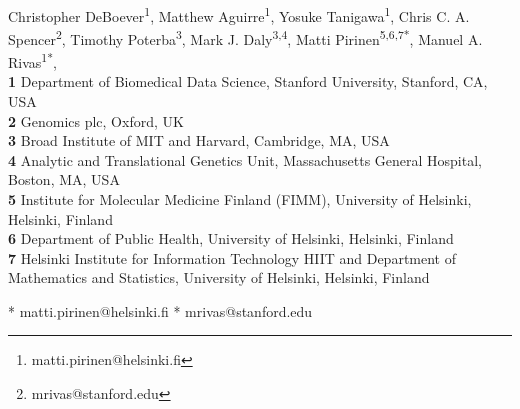 
\usepackage{float}

\newcommand{\lorem}{{\bf LOREM}}
\newcommand{\ipsum}{{\bf IPSUM}}

\def\bs{\boldsymbol}
\def\Vy{\widehat{\textrm{V}}_Y}



\vspace*{0.2in}

\begin{flushleft}
{\Large
\textbf{} %
}
\newline
\\
\author{Christopher DeBoever$^{1}$, Matthew Aguirre$^{1}$, Yosuke Tanigawa$^{1}$, Chris C. A. Spencer$^{2}$, Timothy Poterba$^{3}$, Mark J. Daly$^{4,5}$,  Matti Pirinen$^{5}$\thanks{matti.pirinen@helsinki.fi}, and Manuel A. Rivas$^{1}$\thanks{mrivas@stanford.edu}}
Christopher DeBoever\textsuperscript{1},
Matthew Aguirre\textsuperscript{1},
Yosuke Tanigawa\textsuperscript{1},
Chris C. A. Spencer\textsuperscript{2},
Timothy Poterba\textsuperscript{3},
Mark J. Daly\textsuperscript{3,4},
Matti Pirinen\textsuperscript{5,6,7*},
Manuel A. Rivas\textsuperscript{1*},
\\
\bigskip
\textbf{1} Department of Biomedical Data Science, Stanford University, Stanford, CA, USA
\\
\textbf{2} Genomics plc, Oxford, UK
\\
\textbf{3} Broad Institute of MIT and Harvard, Cambridge, MA, USA
\\
\textbf{4} Analytic and Translational Genetics Unit, Massachusetts General Hospital, Boston, MA, USA
\\
\textbf{5} Institute for Molecular Medicine Finland (FIMM), University of Helsinki, Helsinki, Finland
\\
\textbf{6} Department of Public Health, University of Helsinki, Helsinki, Finland
\\
\textbf{7} Helsinki Institute for Information Technology HIIT and Department of Mathematics and Statistics, University of Helsinki, Helsinki, Finland
\bigskip

* matti.pirinen@helsinki.fi
\newline
* mrivas@stanford.edu

\end{flushleft}
